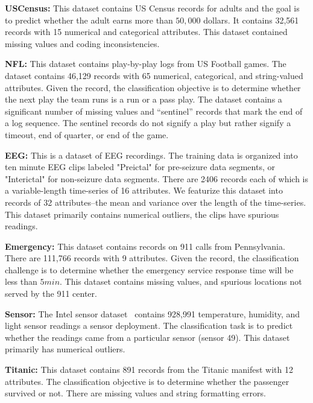 \vspace{0.5em}\noindent\textbf{USCensus: } This dataset contains US Census records for adults and the goal is to predict  whether the adult earns more than $50,000$ dollars. It contains 32,561 records with 15 numerical and categorical attributes. This dataset contained missing values and coding inconsistencies.

\vspace{0.5em}\noindent\textbf{NFL: } This dataset contains play-by-play logs from US Football games. The dataset contains 46,129 records with 65 numerical, categorical, and string-valued attributes. Given the record, the classification objective is to determine whether the next play the team runs is a run or a pass play.
The dataset contains a significant number of missing values and ``sentinel'' records that mark the end of a log sequence. The sentinel records do not signify a play but rather signify a timeout, end of quarter, or end of the game.

\vspace{0.5em}\noindent\textbf{EEG: } This is a dataset of EEG recordings. 
The training data is organized into ten minute EEG clips labeled "Preictal" for pre-seizure data segments, or "Interictal" for non-seizure data segments. 
There are 2406 records each of which is a variable-length time-series of 16 attributes. We featurize this dataset into records of 32 attributes--the mean and variance over the length of the time-series. 
This dataset primarily contains numerical outliers, the clips have spurious readings.

\vspace{0.5em}\noindent\textbf{Emergency: } This dataset contains records on 911 calls from Pennsylvania. There are 111,766 records with 9 attributes. Given the record, the classification challenge is to determine whether the emergency service response time will be less than $5 min$. This dataset contains missing values, and spurious locations not served by the 911 center.

\vspace{0.5em}\noindent\textbf{Sensor: } The Intel sensor dataset~\cite{data, DBLP:journals/pvldb/0002M13, wang1999sample} contains 928,991 temperature, humidity, and light sensor readings a sensor deployment. The classification task is to predict whether the readings came from a particular sensor (sensor 49). This dataset primarily has numerical outliers.

\vspace{0.5em}\noindent\textbf{Titanic: } This dataset contains 891 records from the Titanic manifest with 12 attributes. The classification objective is to determine whether the passenger survived or not. There are missing values and string formatting errors.



